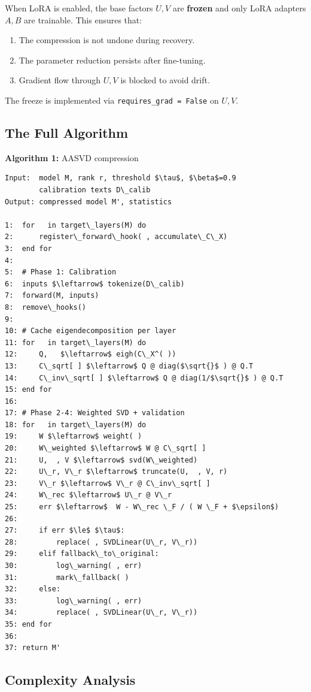 When LoRA is enabled, the base factors $U, V$ are \textbf{frozen} and only LoRA 
adapters $A, B$ are trainable. This ensures that:

\begin{enumerate}
\item The compression is not undone during recovery.
\item The parameter reduction persists after fine-tuning.
\item Gradient flow through $U, V$ is blocked to avoid drift.

\end{enumerate}
The freeze is implemented via \texttt{requires\_grad = False} on $U, V$.

\subsection{The Full Algorithm}

\textbf{Algorithm 1:} AASVD compression
\begin{lstlisting}
Input:  model M, rank r, threshold $\tau$, $\beta$=0.9
        calibration texts D\_calib
Output: compressed model M', statistics

1:  for   in target\_layers(M) do
2:      register\_forward\_hook( , accumulate\_C\_X)
3:  end for
4:
5:  # Phase 1: Calibration
6:  inputs $\leftarrow$ tokenize(D\_calib)
7:  forward(M, inputs)
8:  remove\_hooks()
9:
10: # Cache eigendecomposition per layer
11: for   in target\_layers(M) do
12:     Q,   $\leftarrow$ eigh(C\_X^( ))
13:     C\_sqrt[ ] $\leftarrow$ Q @ diag($\sqrt{}$ ) @ Q.T
14:     C\_inv\_sqrt[ ] $\leftarrow$ Q @ diag(1/$\sqrt{}$ ) @ Q.T
15: end for
16:
17: # Phase 2-4: Weighted SVD + validation
18: for   in target\_layers(M) do
19:     W $\leftarrow$ weight( )
20:     W\_weighted $\leftarrow$ W @ C\_sqrt[ ]
21:     U,  , V $\leftarrow$ svd(W\_weighted)
22:     U\_r, V\_r $\leftarrow$ truncate(U,  , V, r)
23:     V\_r $\leftarrow$ V\_r @ C\_inv\_sqrt[ ]
24:     W\_rec $\leftarrow$ U\_r @ V\_r
25:     err $\leftarrow$  W - W\_rec \_F / ( W \_F + $\epsilon$)
26:
27:     if err $\le$ $\tau$:
28:         replace( , SVDLinear(U\_r, V\_r))
29:     elif fallback\_to\_original:
30:         log\_warning( , err)
31:         mark\_fallback( )
32:     else:
33:         log\_warning( , err)
34:         replace( , SVDLinear(U\_r, V\_r))
35: end for
36:
37: return M'
\end{lstlisting}

\subsection{Complexity Analysis}

